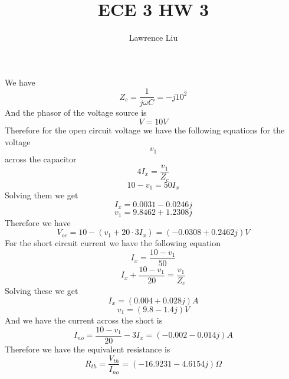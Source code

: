 \documentclass[12pt]{article}
\title{ECE 3 HW 3}
\author{Lawrence Liu}
\begin{document}
\maketitle
We have
$$Z_c=\frac{1}{j\omega C}=-j10^2$$
And the phasor of the voltage source is
$$V=10V$$
Therefore for the open circuit voltage we have the following equations for the voltage
$$v_1$$ across the capacitor
$$4I_x=\frac{v_1}{Z_c}$$
$$10-v_1=50I_x$$
Solving them we get
$$I_x=0.0031-0.0246j$$
$$v_1=9.8462+1.2308j$$
Therefore we have
$$V_{oc}=10-(v_1+20\cdot3I_x)=\boxed{(-0.0308+0.2462j) V}$$
For the short circuit current we have the following equation
$$I_x=\frac{10-v_1}{50}$$
$$I_x+\frac{10-v_1}{20}=\frac{v_1}{Z_c}$$
Solving these we get
$$I_x=(0.004+0.028j)A$$
$$v_1=(9.8-1.4j)V$$
And we have the current across the short is
$$I_{no}=\frac{10-v_1}{20}-3I_x=(-0.002-0.014j)A$$
Therefore we have the equivalent resistance is
$$R_{th}=\frac{V_{th}}{I_{no}}=\boxed{(-16.9231-4.6154j)\Omega}$$
\end{document}
